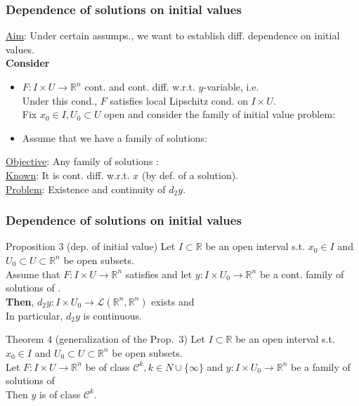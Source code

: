 \documentclass[10pt]{beamer}
\newcommand{\R}{\mathbb{R}}
\begin{document}
{\begin{frame}\frametitle{Dependence of solutions on initial values}
\underline{Aim}: Under certain assumps.,  we want to establish diff. dependence on initial values.\\
\vspace{0.2cm}
\textbf{Consider}
\begin{itemize}
\item[\ding{182}] $F:I \times U \rightarrow \R^n$ cont. and cont. diff. w.r.t. $y$-variable, i.e.  \\
Under this cond.,  $F$ satisfies local Lipschitz cond. on $I \times U$.\\
Fix $x_0\in I, U_0 \subset U$ open and consider the family of initial value problem:\\
\vspace{1.3cm}
\item[\ding{183}] Assume that we have a family of solutions:\\
\vspace{1.5cm}
\end{itemize}
\underline{Objective}: Any family of solutions \textcolor{blue}{}:\\
\vspace{0.2cm}
\underline{Known}: It is cont. diff. w.r.t. $x$ (by def. of a solution).\\
\vspace{0.2cm}
\underline{Problem}: Existence and continuity of $d_2 y$.
\end{frame}

\begin{frame}\frametitle{Dependence of solutions on initial values}
\begin{block}{Proposition 3 (dep. of initial value)}
Let $I \subset \R$ be an open interval s.t.  $x_0\in I$ and $U_0 \subset U \subset \R^n$ be open subsets.\\
Assume that $F: I \times U \rightarrow \R^n$ satisfies \textcolor{blue}{} and let $y:I \times U_0\rightarrow \R^n$ be a cont.  family of solutions of \textcolor{blue}{}.\\
\textbf{Then},  $d_2y: I \times U_0 \rightarrow \mathcal{L}(\R^n, \R^n)$ exists and \\
\vspace{1cm}
In particular, $d_2 y$ is continuous.

\end{block}

\begin{block}{Theorem 4 (generalization of the Prop.~3)}
Let $I \subset \R$ be an open interval s.t.  $x_0\in I$ and $U_0 \subset U \subset \R^n$ be open subsets.\\
Let $F: I \times U \rightarrow \R^n$ be of class $\mathcal{C}^k, k \in N \cup \{\infty\}$ and 
$y:I \times U_0 \rightarrow \R^n$ be a family of solutions of
$$\;$$
Then $y$ is of class $\mathcal{C}^k$.
\end{block}
\end{frame}

}
\end{document}
